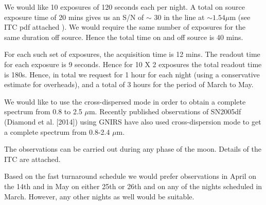 \documentclass[11pt]{article}
\begin{document}
%

\technicaldescription    %
We would like 10 exposures of 120 seconds  each per night. A total on source exposure time of 20 mins  gives us an S/N of $\sim$ 30 in the line at $\sim 1.54 \mu$m (see ITC pdf attached ). 
We would require the same number of exposures for the same duration off source. Hence the total time on and off source is 40 mins. 

For each such set of  exposures, the acquisition time is 12 mins. The readout time for each exposure is 9 seconds. Hence for 10 X 2 exposures the total readout time is 180s. 
Hence, in total we request for 1 hour for each night (using a conservative estimate for overheads), and a total of 3 hours for the period of March to May. 

We would like to use the cross-dispersed mode in order to obtain a complete spectrum from 0.8 to 2.5 $\mu$m. Recently published observations of SN2005df (Diamond et al. [2014]) using GNIRS have also used cross-dispersion mode to get a complete spectrum from 0.8-2.4 $\mu$m.

The observations can be carried out during any phase of the moon. Details of the ITC are attached. 

Based on the fast turnaround schedule we would prefer observations in April on the 14th and in May on either 25th or 26th and on any of the nights scheduled in March. However, any other nights as well would be suitable. 
\bigskip


\end{document}
